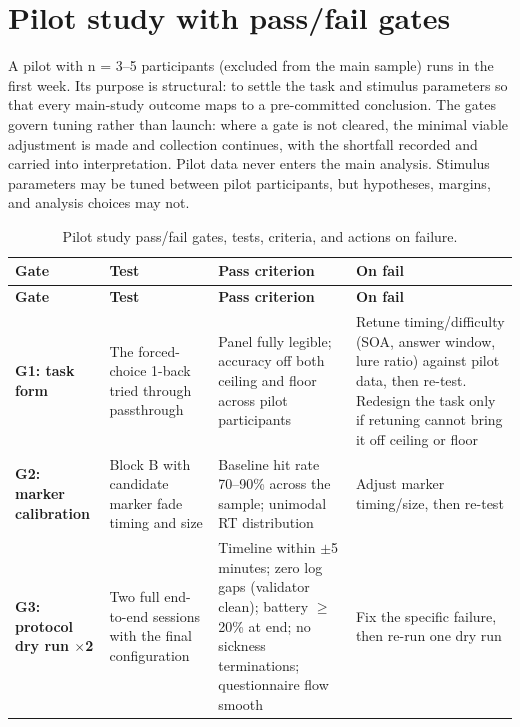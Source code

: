 \section{Pilot study with pass/fail gates}

A pilot with n = 3–5 participants (excluded from the main sample) runs in the first week. Its purpose
is structural: to settle the task and stimulus parameters so that every main-study outcome maps to a
pre-committed conclusion. The gates govern tuning rather than launch: where a gate is not cleared,
the minimal viable adjustment is made and collection continues, with the shortfall recorded and
carried into interpretation. Pilot data never enters the main analysis. Stimulus parameters may be tuned
between pilot participants, but hypotheses, margins, and analysis choices may not.

\begin{longtable}{p{}|p{}|p{}|p{}}
\caption{Pilot study pass/fail gates, tests, criteria, and actions on failure.}\\
\hline
\textbf{Gate} & \textbf{Test} & \textbf{Pass criterion} & \textbf{On fail} \\
\hline
\endfirsthead
\hline
\textbf{Gate} & \textbf{Test} & \textbf{Pass criterion} & \textbf{On fail} \\
\hline
\endhead
\hline
\textbf{G1: task form} & The forced-choice 1-back tried through passthrough & Panel fully legible; accuracy off both ceiling and floor across pilot participants & Retune timing/difficulty (SOA, answer window, lure ratio) against pilot data, then re-test. Redesign the task only if retuning cannot bring it off ceiling or floor \\
\textbf{G2: marker calibration} & Block B with candidate marker fade timing and size & Baseline hit rate 70–90\% across the sample; unimodal RT distribution & Adjust marker timing/size, then re-test \\
\textbf{G3: protocol dry run $\times$2} & Two full end-to-end sessions with the final configuration & Timeline within $\pm$5 minutes; zero log gaps (validator clean); battery $\geq$ 20\% at end; no sickness terminations; questionnaire flow smooth & Fix the specific failure, then re-run one dry run \\
\hline
\end{longtable}

